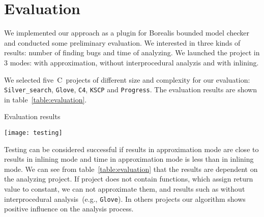 \section{Evaluation}\label{sec:evaluation}

We implemented our approach as a plugin for Borealis bounded model checker and conducted some preliminary evaluation. We interested in three kinds of results: number of finding bugs and time of analyzing. We launched the project in 3 modes: with approximation, without interprocedural analyzis and with inlining.

We selected five~C~projects of different size and complexity for our evaluation: \texttt{Silver_search}, \texttt{Glove}, \texttt{C4}, \texttt{KSCP} and \texttt{Progress}. The evaluation results are shown in table~\ref{table:evaluation}.

\begin{table}[H]
\centering
\caption{Evaluation results}
\label{table:evaluation}
\texttt{[image: testing]}
\end{table}

Testing can be considered successful if results in approximation mode are close to results in inlining mode and time in approximation mode is less than in inlining mode. We can see from table~\ref{table:evaluation} that the results are dependent on the analyzing project. If project does not contain functions, which assign return value to constant, we can not approximate them, and results such as without interprocedural analysis~(e.g., \texttt{Glove}). In others projects our algorithm shows positive influence on the analysis process. 